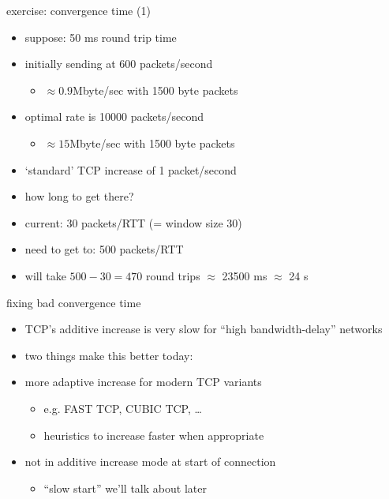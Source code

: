 \begin{frame}{exercise: convergence time (1)}
    \begin{itemize}
    \item suppose: 50 ms round trip time
    \item initially sending at 600 packets/second
        \begin{itemize}
        \item $\approx 0.9$Mbyte/sec with 1500 byte packets
        \end{itemize}
    \item optimal rate is 10000 packets/second
        \begin{itemize}
        \item $\approx 15$Mbyte/sec with 1500 byte packets
        \end{itemize}
    \item `standard' TCP increase of 1 packet/second
    \item how long to get there?
    \vspace{.5cm}
    \item<2-> current: 30 packets/RTT (= window size 30)
    \item<2-> need to get to: 500 packets/RTT
    \item<2-> will take $500-30=470$ round trips $\approx$ 23500 ms $\approx$ 24 s
    \end{itemize}
\end{frame}

\begin{frame}{fixing bad convergence time}
    \begin{itemize}
    \item TCP's additive increase is very slow for ``high bandwidth-delay'' networks
    \item two things make this better today:
    \vspace{.5cm}
    \item more adaptive increase for modern TCP variants
        \begin{itemize}
        \item e.g. FAST TCP, CUBIC TCP, \ldots
        \item heuristics to increase faster when appropriate
        \end{itemize}
    \item not in additive increase mode at start of connection
        \begin{itemize}
        \item ``slow start'' we'll talk about later
        \end{itemize}
    \end{itemize}
\end{frame}
